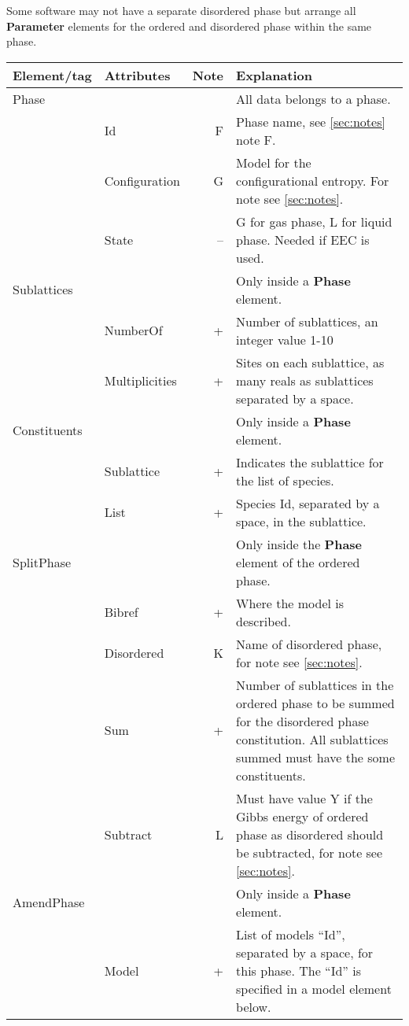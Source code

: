 \documentclass{article}
\begin{document}
Some software may not have a separate disordered phase but arrange all
{\bf Parameter} elements for the ordered and disordered phase within
the same phase.

\begin{tabular}{|p{} p{} r p{}|}\hline
  Element/tag & Attributes & Note & Explanation\\\hline

  Phase & && All data belongs to a phase.\\
       & Id & F & Phase name, see \ref{sec:notes} note F. \\
       & Configuration & G & Model for the configurational entropy.  For note see \ref{sec:notes}.\\
       & State & -- & G for gas phase, L for liquid phase.  Needed if EEC is used.\\\hline

  Sublattices & && Only inside a {\bf Phase} element.\\
        & NumberOf & + & Number of sublattices, an integer value 1-10 \\
        & Multiplicities & + & Sites on each sublattice, as many reals as sublattices separated by a space.\\\hline

  Constituents & && Only inside a {\bf Phase} element.\\
        & Sublattice & + & Indicates the sublattice for the list of species.\\
        & List & + & Species Id, separated by a space, in the sublattice.\\\hline

  SplitPhase & && Only inside the {\bf Phase} element of the ordered phase.\\
      & Bibref & + & Where the model is described.\\
      & Disordered & K & Name of disordered phase, for note see \ref{sec:notes}.\\
      & Sum & + & Number of sublattices in the ordered phase to be summed for the disordered phase constitution.  All sublattices summed must have the some constituents.\\
      & Subtract & L & Must have value Y if the Gibbs energy of ordered phase as disordered should be subtracted, for note see \ref{sec:notes}.\\\hline

  AmendPhase & && Only inside a {\bf Phase} element.\\
  & Model & + & List of models ``Id'', separated by a space, for this phase.  The ``Id'' is specified in a model element below.\\\hline
\end{tabular}
\end{document}
